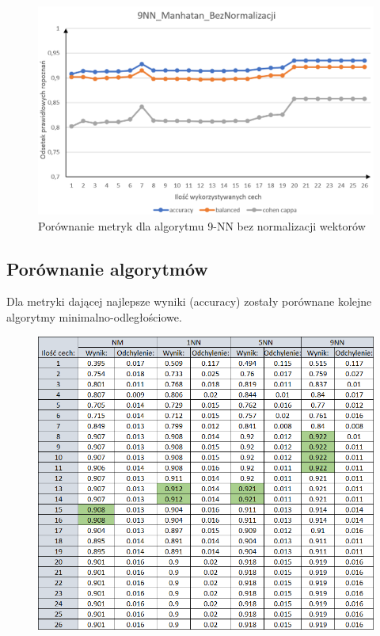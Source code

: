 \documentclass[12pt]{article}
\begin{document}
\begin{figure}[H]
	\centering
		\includegraphics[scale=0.66]{images/metrics/9nn_manhatan_beznorm.png}
	\caption{Porównanie metryk dla algorytmu 9-NN bez normalizacji wektorów}
	\label{metryki_manhatan_bnorm_wyk}
\end{figure}
\subsection{Porównanie algorytmów}
\indent Dla metryki dającej najlepsze wyniki (accuracy) zostały porównane kolejne algorytmy minimalno-odległościowe.
\begin{figure}[H]
	\centering
	\label{algorytmy_euklides_norm_tab}
		\includegraphics[scale=0.8]{images/algorithms/euklides_norm_tab.png}
	
\end{figure}
\end{document}
